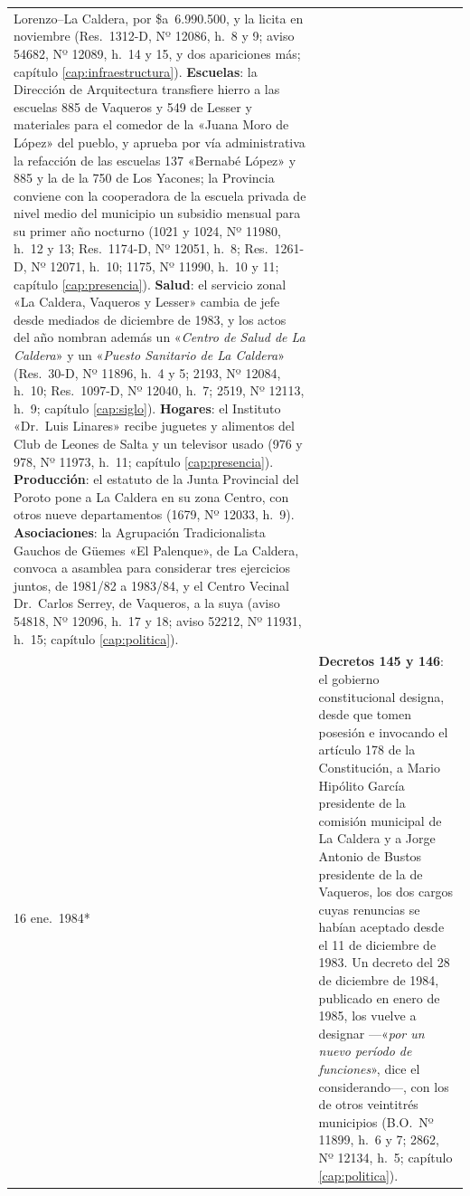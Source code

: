 \begin{longtable}{@{}p{2.7cm}p{10.3cm}@{}}
Lorenzo--La Caldera, por \$a~6.990.500, y la licita en noviembre (Res.\ 1312-D, Nº 12086, h.\ 8 y 9; aviso 54682, Nº 12089, h.\ 14 y 15, y dos apariciones más; capítulo \ref{cap:infraestructura}). \textbf{Escuelas}: la Dirección de Arquitectura transfiere hierro a las escuelas 885 de Vaqueros y 549 de Lesser y materiales para el comedor de la «Juana Moro de López» del pueblo, y aprueba por vía administrativa la refacción de las escuelas 137 «Bernabé López» y 885 y la de la 750 de Los Yacones; la Provincia conviene con la cooperadora de la escuela privada de nivel medio del municipio un subsidio mensual para su primer año nocturno (1021 y 1024, Nº 11980, h.\ 12 y 13; Res.\ 1174-D, Nº 12051, h.\ 8; Res.\ 1261-D, Nº 12071, h.\ 10; 1175, Nº 11990, h.\ 10 y 11; capítulo \ref{cap:presencia}). \textbf{Salud}: el servicio zonal «La Caldera, Vaqueros y Lesser» cambia de jefe desde mediados de diciembre de 1983, y los actos del año nombran además un «\textit{Centro de Salud de La Caldera}» y un «\textit{Puesto Sanitario de La Caldera}» (Res.\ 30-D, Nº 11896, h.\ 4 y 5; 2193, Nº 12084, h.\ 10; Res.\ 1097-D, Nº 12040, h.\ 7; 2519, Nº 12113, h.\ 9; capítulo \ref{cap:siglo}). \textbf{Hogares}: el Instituto «Dr.\ Luis Linares» recibe juguetes y alimentos del Club de Leones de Salta y un televisor usado (976 y 978, Nº 11973, h.\ 11; capítulo \ref{cap:presencia}). \textbf{Producción}: el estatuto de la Junta Provincial del Poroto pone a La Caldera en su zona Centro, con otros nueve departamentos (1679, Nº 12033, h.\ 9). \textbf{Asociaciones}: la Agrupación Tradicionalista Gauchos de Güemes «El Palenque», de La Caldera, convoca a asamblea para considerar tres ejercicios juntos, de 1981/82 a 1983/84, y el Centro Vecinal Dr.\ Carlos Serrey, de Vaqueros, a la suya (aviso 54818, Nº 12096, h.\ 17 y 18; aviso 52212, Nº 11931, h.\ 15; capítulo \ref{cap:politica}). \\
16 ene.\ 1984* & \textbf{Decretos 145 y 146}: el gobierno constitucional designa, desde que tomen posesión e invocando el artículo 178 de la Constitución, a Mario Hipólito García presidente de la comisión municipal de La Caldera y a Jorge Antonio de Bustos presidente de la de Vaqueros, los dos cargos cuyas renuncias se habían aceptado desde el 11 de diciembre de 1983. Un decreto del 28 de diciembre de 1984, publicado en enero de 1985, los vuelve a designar ---«\textit{por un nuevo período de funciones}», dice el considerando---, con los de otros veintitrés municipios (B.O.\ Nº 11899, h.\ 6 y 7; 2862, Nº 12134, h.\ 5; capítulo \ref{cap:politica}). \\

\end{longtable}
